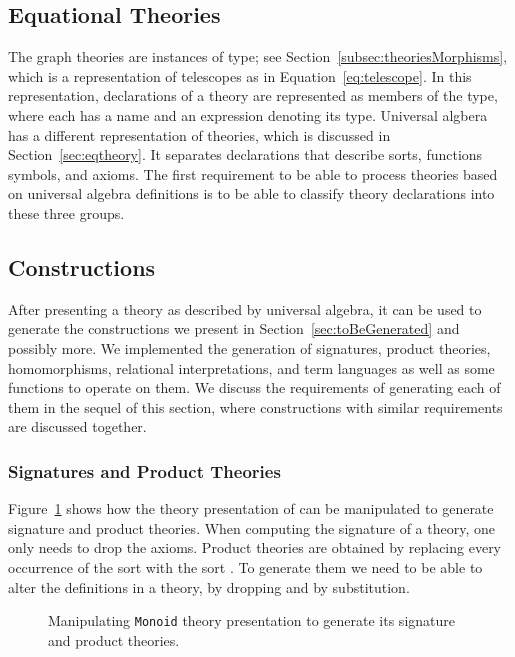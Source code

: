 \subsection{Equational Theories}
\label{sec:gen:reqs:eqtheories}
The graph theories are instances of  type; see Section~\ref{subsec:theoriesMorphisms}, which is a representation of telescopes as in Equation~\ref{eq:telescope}. In this representation, declarations of a theory are represented as members of the  \lstmath{[Constr]} type, where each  has a name and an expression denoting its type. 
Universal algbera has a different representation of theories, which is discussed in Section~\ref{sec:eqtheory}. It separates declarations that describe sorts, functions symbols, and axioms. The first requirement to be able to process theories based on universal algebra definitions is to be able to classify theory declarations into these three groups. 

\subsection{Constructions}
\label{sec:gen:reqs:constructions}
After presenting a theory as described by universal algebra, it can be used to generate the constructions we present in Section~\ref{sec:toBeGenerated} and possibly more. We implemented the generation of signatures, product theories, homomorphisms, relational interpretations, and term languages as well as some functions to operate on them. We discuss the requirements of generating each of them in the sequel of this section, where constructions with similar requirements are discussed together.  

\subsubsection{Signatures and Product Theories}
Figure~\ref{fig:monoid-sig-prod} shows how the theory presentation of  can be manipulated to generate signature and product theories. When computing the signature of a theory, one only needs to drop the axioms. Product theories are obtained by replacing every occurrence of the sort  with the sort . To generate them we need to be able to alter the definitions in a theory, by dropping and by substitution. 

\begin{figure}

\caption{Manipulating \lstinline|Monoid| theory presentation to generate its signature and product theories.}
\label{fig:monoid-sig-prod}
\end{figure}

